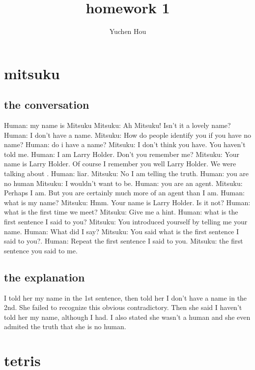 \documentclass[12pt]{article}
\begin{document}
\title{homework 1}
\author{Yuchen Hou}
\maketitle

\section{mitsuku}
\subsection{the conversation}
Human: my name is Mitsuku
Mitsuku: Ah Mitsuku! Isn't it a lovely name?
Human: I don't have a name.
Mitsuku: How do people identify you if you have no name?
Human: do i have a name?
Mitsuku: I don't think you have. You haven't told me.
Human: I am  Larry Holder. Don't you remember me?
Mitsuku:  Your name is Larry Holder. Of course I remember you well Larry Holder. We were talking about .
Human: liar.
Mitsuku: No I am telling the truth.
Human: you are no human
Mitsuku: I wouldn't want to be.
Human: you are an agent.
Mitsuku:  Perhaps I am. But you are certainly much more of an agent than I am.
Human: what is my name?
Mitsuku: Hmm. Your name is Larry Holder. Is it not?
Human: what is the  first time we meet?
Mitsuku: Give me a hint.
Human: what is the first sentence I said to you?
Mitsuku: You introduced yourself by telling me your name.
Human: What did I say?
Mitsuku: You said what is the first sentence I said to you?.
Human: Repeat the first sentence I said to you.
Mitsuku: the first sentence you said to me.
\subsection{the explanation}
I told her my name in the 1st sentence, then told her I don't have a name in the 2nd. She failed to recognize this obvious contradictory. Then she said I haven't told her my name, although I had. I also stated she wasn't a human and she even admited the truth that she is no human.

\section{tetris}
\end{document}
